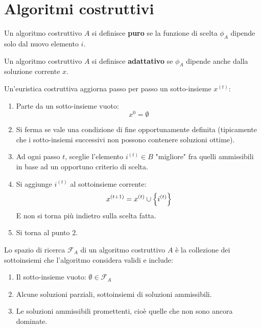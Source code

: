 \documentclass[\main/main.tex]{subfiles}
\providecommand{\f}{\mathcal{F}}
\providecommand{\fa}{\f_A}
\begin{document}
\chapter{Algoritmi costruttivi}
\begin{multicols}{2}
\begin{definition}
    Un algoritmo costruttivo \(A\) si definisce \textbf{puro} se la funzione di scelta \(\phi_A\) dipende solo dal nuovo elemento \(i\).
\end{definition}
\begin{definition}
    Un algoritmo costruttivo \(A\) si definisce \textbf{adattativo} se \(\phi_A\) dipende anche dalla soluzione corrente \(x\).
\end{definition}
\begin{definition}
    Un'euristica costruttiva aggiorna passo per passo un sotto-insieme \(x^{(t)}\):
    \begin{enumerate}
        \item Parte da un sotto-insieme vuoto:
        \[
            x^{0} = \emptyset
        \]
        \item Si ferma se vale una condizione di fine opportunamente definita (tipicamente che i sotto-insiemi successivi non possono contenere soluzioni ottime).
        \item Ad ogni passo \(t\), sceglie l'elemento \(i^{(t)} \in B\) "migliore" fra quelli ammissibili in base ad un opportuno criterio di scelta.
        \item Si aggiunge \(i^{(t)}\) al sottoinsieme corrente:
        \[
            x^{(t+1)} = x^{(t)} \cup \left\{i^{(t)}\right\}
        \]
        E non si torna più indietro sulla scelta fatta.
        \item Si torna al punto 2.
    \end{enumerate}
\end{definition}
\begin{definition}
    Lo spazio di ricerca \(\fa\) di un algoritmo costruttivo \(A\) è la collezione dei sottoinsiemi che l'algoritmo considera validi e include:
    \begin{enumerate}
        \item Il sotto-insieme vuoto: \(\emptyset \in \fa\)
        \item Alcune soluzioni parziali, sottoinsiemi di soluzioni ammissibili.
        \item Le soluzioni ammissibili promettenti, cioè quelle che non sono ancora dominate.

\end{enumerate}
\end{definition}
\end{multicols}
\end{document}
